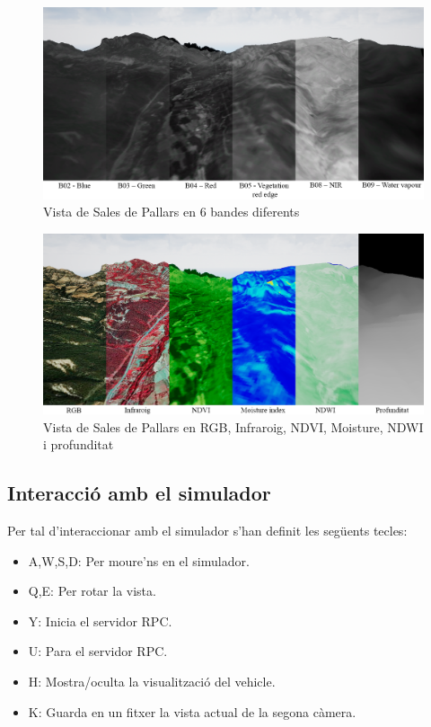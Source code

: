 \documentclass[10pt,a4paper,twocolumn,twoside]{article}
\begin{document}
\begin{figure}[!h]
\centering
  	\includegraphics[width=1\textwidth]{multispectral/bands}
	\caption{Vista de Sales de Pallars en 6 bandes diferents}
	\label{fig-bands}
\end{figure}

\begin{figure}[!h]
\centering
  	\includegraphics[width=1\textwidth]{multispectral/spectralindexes}
	\caption{Vista de Sales de Pallars en RGB, Infraroig, NDVI, Moisture, NDWI i profunditat}
	\label{fig-spectralindexes}
\end{figure}

\subsection{Interacció amb el simulador}
Per tal d'interaccionar amb el simulador s'han definit les següents tecles:

\begin{itemize}
\item A,W,S,D: Per moure'ns en el simulador.
\item Q,E: Per rotar la vista.
\item Y: Inicia el servidor RPC.
\item U: Para el servidor RPC.
\item H: Mostra/oculta la visualització del vehicle.
\item K: Guarda en un fitxer la vista actual de la segona càmera.
\end{itemize}
\end{document}
